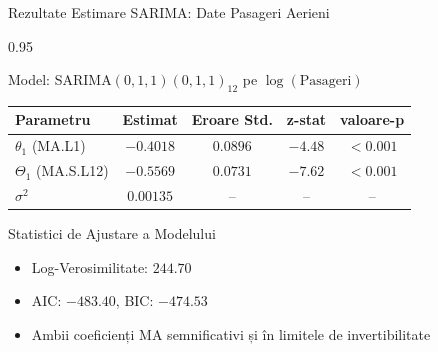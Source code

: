 \documentclass[9pt, aspectratio=169, t]{beamer}
\begin{document}
\begin{frame}{Rezultate Estimare SARIMA: Date Pasageri Aerieni}
    \begin{cminipage}{0.95\textwidth}
    {\small
    \begin{block}{Model: SARIMA$(0,1,1)(0,1,1)_{12}$ pe $\log(\text{Pasageri})$}
        \begin{center}
        \begin{tabular}{lcccc}
            \toprule
            \textbf{Parametru} & \textbf{Estimat} & \textbf{Eroare Std.} & \textbf{z-stat} & \textbf{valoare-p} \\
            \midrule
            $\theta_1$ (MA.L1) & $-0.4018$ & $0.0896$ & $-4.48$ & $<0.001$ \\
            $\Theta_1$ (MA.S.L12) & $-0.5569$ & $0.0731$ & $-7.62$ & $<0.001$ \\
            $\sigma^2$ & $0.00135$ & -- & -- & -- \\
            \bottomrule
        \end{tabular}
        \end{center}
    \end{block}

    \vspace{0.2cm}

    \begin{exampleblock}{Statistici de Ajustare a Modelului}
        \begin{itemize}\setlength{\itemsep}{0pt}
            \item Log-Verosimilitate: $244.70$
            \item AIC: $-483.40$, BIC: $-474.53$
            \item Ambii coeficienți MA semnificativi și în limitele de invertibilitate
        \end{itemize}
    \end{exampleblock}
    }
    \end{cminipage}
\end{frame}
\end{document}
